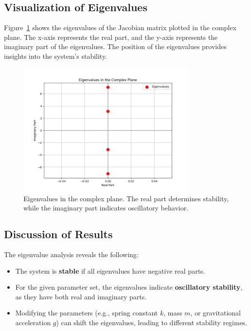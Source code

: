 \documentclass[12pt]{article}
\begin{document}
\subsection{Visualization of Eigenvalues}
Figure~\ref{fig:eigenvalues_complex_plane} shows the eigenvalues of the Jacobian matrix plotted in the complex plane. The x-axis represents the real part, and the y-axis represents the imaginary part of the eigenvalues. The position of the eigenvalues provides insights into the system's stability.

\begin{figure}[h!]
    \centering
    \includegraphics[width=0.8\textwidth]{eigenvalues_complex_plane.png}
    \caption{Eigenvalues in the complex plane. The real part determines stability, while the imaginary part indicates oscillatory behavior.}
    \label{fig:eigenvalues_complex_plane}
\end{figure}

\subsection{Discussion of Results}
The eigenvalue analysis reveals the following:
\begin{itemize}
    \item The system is \textbf{stable} if all eigenvalues have negative real parts.
    \item For the given parameter set, the eigenvalues indicate \textbf{oscillatory stability}, as they have both real and imaginary parts.
    \item Modifying the parameters (e.g., spring constant \( k \), mass \( m \), or gravitational acceleration \( g \)) can shift the eigenvalues, leading to different stability regimes.
\end{itemize}
\end{document}
